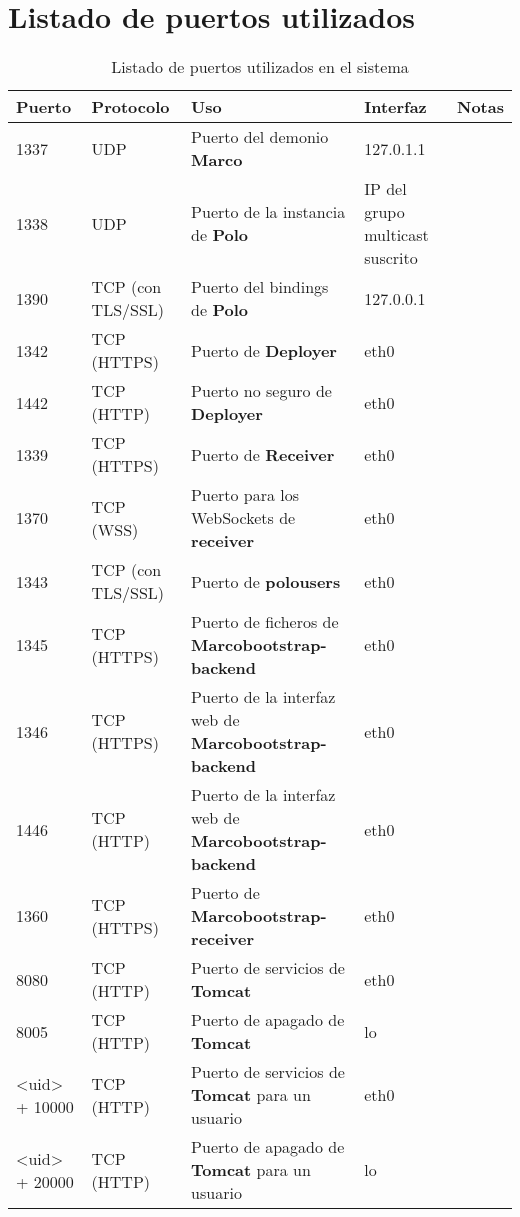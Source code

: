 \chapter{Listado de puertos utilizados}

\begin{table}[H]
\centering
\begin{tabular}{|p{1.5cm}|p{2.5cm}|p{5cm}|p{2.5cm}|l|}\hline
\textbf{Puerto}&\textbf{Protocolo}&\textbf{Uso}&\textbf{Interfaz}&\textbf{Notas}\\
\hline
1337&UDP&Puerto del demonio \textbf{Marco}&127.0.1.1&\\
\hline
1338&UDP&Puerto de la instancia de \textbf{Polo}&IP del grupo multicast suscrito&\\
\hline
1390&TCP (con TLS/SSL)&Puerto del bindings de \textbf{Polo}&127.0.0.1&\\
\hline
1342&TCP (HTTPS)&Puerto de \textbf{Deployer}&eth0&\\
\hline
1442&TCP (HTTP)&Puerto no seguro de \textbf{Deployer}&eth0&\\
\hline
1339&TCP (HTTPS)&Puerto de \textbf{Receiver}&eth0&\\
\hline
1370&TCP (WSS)&Puerto para los WebSockets de \textbf{receiver}&eth0&\\
\hline
1343&TCP (con TLS/SSL)&Puerto de \textbf{polousers}&eth0&\\
\hline
1345&TCP (HTTPS)&Puerto de ficheros de \textbf{Marcobootstrap-backend}&eth0&\\
\hline
1346&TCP (HTTPS)&Puerto de la interfaz web de \textbf{Marcobootstrap-backend}&eth0&\\
\hline
1446&TCP (HTTP)&Puerto de la interfaz web de \textbf{Marcobootstrap-backend}&eth0&\\
\hline
1360&TCP (HTTPS)&Puerto de \textbf{Marcobootstrap-receiver}&eth0&\\
\hline
8080&TCP (HTTP)&Puerto de servicios de \textbf{Tomcat}&eth0&\\
\hline
8005&TCP (HTTP)&Puerto de apagado de \textbf{Tomcat}&lo&\\
\hline
<uid> + 10000&TCP (HTTP)&Puerto de servicios de \textbf{Tomcat} para un usuario&eth0&\\
\hline
<uid> + 20000&TCP (HTTP)&Puerto de apagado de \textbf{Tomcat} para un usuario&lo&\\
\hline
\end{tabular}
\caption{Listado de puertos utilizados en el sistema}
\label{ports}
\end{table}